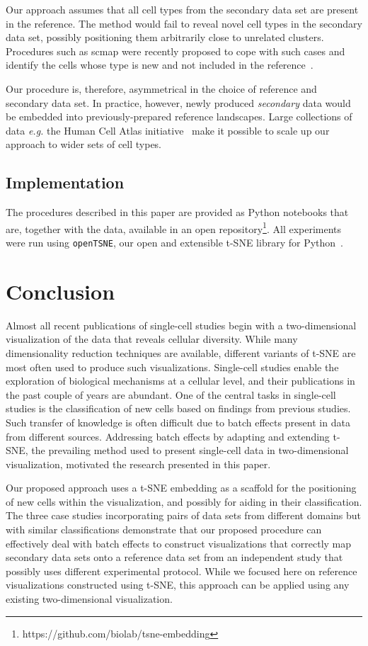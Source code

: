 \documentclass[runningheads]{llncs}
\begin{document}
Our approach assumes that all cell types from the secondary data set are
present in the reference. The method would fail to reveal novel cell
types in the secondary data set, possibly positioning them arbitrarily close to
unrelated clusters. Procedures such as scmap were recently proposed to cope
with such cases and identify the cells whose type is new and not included in
the reference~\cite{scmap}.

Our procedure is, therefore, asymmetrical in the choice of reference and secondary data set.
In practice, however, newly produced {\em secondary} data would be embedded into previously-prepared reference landscapes. Large collections of data {\em e.g.} the
Human Cell Atlas initiative~\cite{hca} make it possible to scale up our approach to wider sets of cell types.


\subsection{Implementation\label{sec:implementation}}

The procedures described in this paper are provided as Python notebooks that
are, together with the data, available in an open
repository\footnote{https://github.com/biolab/tsne-embedding}. All experiments
were run using {\tt openTSNE},
our open and extensible t-SNE library for Python~\cite{opentsne}.

\section{Conclusion}

Almost all recent publications of single-cell studies begin with a
two-dimensional visualization of the data that reveals cellular diversity.
While many dimensionality reduction techniques are available, different 
variants of t-SNE are most often used to produce such
visualizations. Single-cell studies enable the exploration of biological mechanisms at a
cellular level, and their publications in the past couple of years are abundant.
One of the central tasks in single-cell
studies is the classification of new cells based on findings from previous
studies. Such transfer of knowledge is often difficult due to batch effects
present in data from different sources. Addressing batch effects by adapting
and extending t-SNE, the prevailing method used to present single-cell data in
two-dimensional visualization, motivated the research presented in this paper.

Our proposed approach uses a t-SNE embedding as a scaffold for the positioning
of new cells within the visualization, and possibly for aiding in their
classification. The three case studies incorporating pairs of data sets from
different domains but with similar classifications demonstrate that our
proposed procedure can effectively deal with batch effects to construct
visualizations that correctly map secondary data sets onto a reference data set
from an independent study that possibly uses different experimental protocol.
While we focused here on reference visualizations constructed using t-SNE, this
approach can be applied using any existing two-dimensional visualization.
\end{document}
